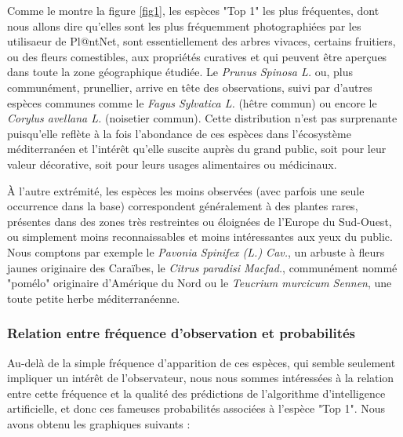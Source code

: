 \documentclass[a4paper,12pt]{article}
\begin{document}
Comme le montre la figure \ref{fig1}, les espèces "Top 1" les plus fréquentes, dont nous allons dire qu'elles sont les plus fréquemment photographiées par les utilisaeur de Pl@ntNet, sont essentiellement des arbres vivaces, certains fruitiers, ou des fleurs comestibles, aux propriétés curatives et qui peuvent être aperçues dans toute la zone géographique étudiée. Le \textit{Prunus Spinosa L.} ou, plus communément, prunellier, arrive en tête des observations, suivi par d'autres espèces communes comme le \textit{Fagus Sylvatica L.} (hêtre commun) ou encore le \textit{Corylus avellana L.} (noisetier commun). Cette distribution n'est pas surprenante puisqu'elle reflète à la fois l'abondance de ces espèces dans l'écosystème méditerranéen et l'intérêt qu'elle suscite auprès du grand public, soit pour leur valeur décorative, soit pour leurs usages alimentaires ou médicinaux.

\vspace{0.2cm}

À l'autre extrémité, les espèces les moins observées (avec parfois une seule occurrence dans la base) correspondent généralement à des plantes rares, présentes dans des zones très restreintes ou éloignées de l'Europe du Sud-Ouest, ou simplement moins reconnaissables et moins intéressantes aux yeux du public. Nous comptons par exemple le \textit{Pavonia Spinifex (L.) Cav.}, un arbuste à fleurs jaunes originaire des Caraïbes, le \textit{Citrus paradisi Macfad.}, communément nommé "pomélo" originaire d'Amérique du Nord ou le \textit{Teucrium murcicum Sennen}, une toute petite herbe méditerranéenne.

\subsubsection{Relation entre fréquence d'observation et probabilités}

Au-delà de la simple fréquence d'apparition de ces espèces, qui semble seulement impliquer un intérêt de l'observateur, nous nous sommes intéressées à la relation entre cette fréquence et la qualité des prédictions de l'algorithme d'intelligence artificielle, et donc ces fameuses probabilités associées à l'espèce "Top 1".  Nous avons obtenu les graphiques suivants :
\end{document}
